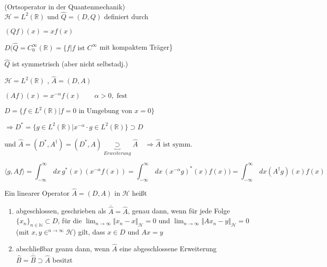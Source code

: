



\begin{Bsp}{(Ortsoperator in der Quantenmechanik)\\}
    $\mathcal{H} = L^2(\mathbb{R})$ und $\hat{Q} = (D,Q)$ definiert durch

    $(Qf)(x) = x f(x)$

    $D(\hat{Q} = C_0^\infty (\mathbb{R})= \{f | f \textrm{ ist } C^\infty$ mit kompaktem Träger\}

    $\hat{Q}$ ist symmetrisch (aber nicht selbstadj.)
\end{Bsp}

\begin{Bsp}
    $\mathcal{H} = L^2(\mathbb{R})$ , $\hat{A} = (D,A)$

    $(Af)(x) = x^{-\alpha} f(x) \quad \quad \alpha > 0, \textrm{ fest}$

    $D = \{f \in L^2(\mathbb{R}) | f=0 \textrm{ in Umgebung von } x = 0 \}$

    $\Rightarrow D^\ast = \{g \in L^2(\mathbb{R}) | x^{- \alpha} \cdot g \in L^2(\mathbb{R})\} \supset D$

    und $\hat{A} = (D^\ast, A^\dagger) = (D^\ast, A) \underbrace{\supset}_{Erweiterung} \hat{A} \quad \Rightarrow \hat{A} \textrm{ ist symm.}$ 

    $$\langle g , Af \rangle = \int_{-\infty}^\infty \,dx \, g^\ast(x) (x^{- \alpha} f(x)) = 
    \int_{-\infty}^\infty \,dx \, (x^{- \alpha} g)^\ast(x) f(x)) = \int_{-\infty}^\infty \,dx (A^\dagger g)(x) f(x)$$
\end{Bsp}

\begin{Def}
    Ein linearer Operator $\hat{A} = (D,A)$ in $\mathcal{H}$ heißt
    \begin{enumerate}[label=(\alph*)]
        \item abgeschlossen, geschrieben als $\overline{\hat{A}} = \hat{A}$, genau dann, wenn für jede Folge
                $\{x_n\}_{n \in \mathbb{N}} \subset D$, für die $\lim_{n \rightarrow \infty} {\Vert x_n -x \Vert}_\mathcal{H} = 0$ und $\lim_{n \rightarrow \infty} {\Vert Ax_n -y \Vert}_\mathcal{H} = 0$
                (mit $x,y \in^{n \rightarrow \infty} \mathcal{H}$) gilt, dass $x \in D$ und $Ax = y$
        \item abschließbar geanu dann, wenn $\hat{A}$ eine abgeschlossene Erweiterung 
                $\hat{B} = \overline{\hat{B}} \supset \hat{A}$ besitzt
    \end{enumerate}
\end{Def}


